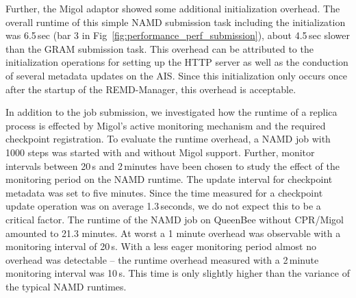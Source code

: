 \documentclass[times, 10pt, twocolumn]{article}
\begin{document}
Further, the Migol adaptor showed some additional initialization
overhead.  The overall runtime of this simple NAMD submission task
including the initialization was 6.5\,sec (bar 3 in
Fig~\ref{fig:performance_perf_submission}), about 4.5\,sec slower than
the GRAM submission task. This overhead can be attributed to the
initialization operations for setting up the HTTP server as well as
the conduction of several metadata updates on the AIS. Since this
initialization only occurs once after the startup of the REMD-Manager,
this overhead is acceptable.
                                                                                                                    
In addition to the job submission, we investigated how the runtime of
a replica process is effected by Migol's active monitoring mechanism
and the required checkpoint registration.  To evaluate the runtime
overhead, a NAMD job with 1000 steps was started with and without
Migol support.  Further, monitor intervals between 20\,s and
2\,minutes have been chosen to study the effect of the monitoring
period on the NAMD runtime.  The update interval for checkpoint
metadata was set to five minutes.  Since the time measured for a
checkpoint update operation was on average 1.3\,seconds, we do not
expect this to be a critical factor.  The runtime of the NAMD job on
QueenBee without CPR/Migol amounted to 21.3 minutes.  At worst a 1
minute overhead was observable with a monitoring interval of
20\,s. With a less eager monitoring period almost no overhead was
detectable -- the runtime overhead measured with a 2\,minute
monitoring interval was 10\,s. This time is only slightly higher than
the variance of the typical NAMD runtimes.
\end{document}
